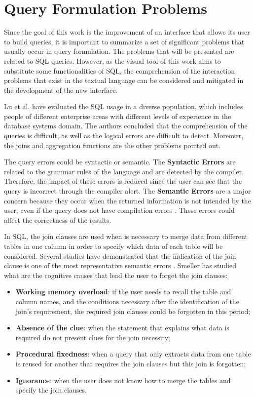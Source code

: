 \section{Query Formulation Problems}
\label{sec:query_formulation_problems}
Since the goal of this work is the improvement of an interface that allows its user to build queries, it is important to summarize a set of significant problems that usually occur in query formulation. The problems that will be presented are related to SQL queries. However, as the visual tool of this work aims to substitute some functionalities of SQL, the comprehension of the interaction problems that exist in the textual language can be considered and mitigated in the development of the new interface. 

Lu et al. \cite{aSurveyOnUsageOfSQL} have evaluated the SQL usage in a diverse population, which includes people of different enterprise areas with different levels of experience in the database systems domain. The authors concluded that the comprehension of the queries is difficult, as well as the logical errors are difficult to detect. Moreover, the joins and aggregation functions are the other problems pointed out.

The query errors could be syntactic or semantic. The \textbf{Syntactic Errors} are related to the grammar rules of the language and are detected by the compiler. Therefore, the impact of these errors is reduced since the user can see that the query is incorrect through the compiler alert. The \textbf{Semantic Errors} are a major concern because they occur when the returned information is not intended by the user, even if the query does not have compilation errors \cite{userErrorsInDatabaseQueryComposition}. These errors could affect the correctness of the results.

In SQL, the join clauses are used when is necessary to merge data from different tables in one column in order to specify which data of each table will be considered. Several studies have demonstrated that the indication of the join clause is one of the most representative semantic errors \cite{studentsSemanticMistakesInWritingSevenDifferentTypesOfSQLQueries,aSurveyOnUsageOfSQL}. Smeller \cite{userErrorsInDatabaseQueryComposition} has studied what are the cognitive causes that lead the user to forget the join clauses:

\begin{itemize}
  \item \textbf{Working memory overload}: if the user needs to recall the table and column names, and the conditions necessary after the identification of the join's requirement, the required join clauses could be forgotten in this period;
  \item \textbf{Absence of the clue}: when the statement that explains what data is required do not present clues for the join necessity;
  \item \textbf{Procedural fixedness}: when a query that only extracts data from one table is reused for another that requires the join clauses but this join is forgotten;
  \item \textbf{Ignorance}:  when the user does not know how to merge the tables and specify the join clauses.
\end{itemize}

